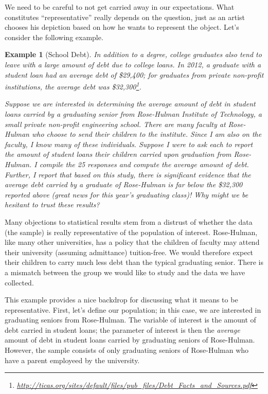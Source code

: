 \documentclass[
]{book}
\theoremstyle{plain}
\theoremstyle{mydefn}
\theoremstyle{myexmpl}
\newtheorem{example}{Example}[chapter]
\theoremstyle{remark}
\begin{document}
We need to be careful to not get carried away in our expectations. What constitutes ``representative'' really depends on the question, just as an artist chooses his depiction based on how he wants to represent the object. Let's consider the following example.

\begin{example}[School Debt]
\protect\hypertarget{exm:data-school-debt}{}{\label{exm:data-school-debt} {} }In addition to a degree, college graduates also tend to leave with a large amount of debt due to college loans. In 2012, a graduate with a student loan had an average debt of \$29,400; for graduates from private non-profit institutions, the average debt was \$32,300\footnote{\url{http://ticas.org/sites/default/files/pub_files/Debt_Facts_and_Sources.pdf}}.

Suppose we are interested in determining the average amount of debt in student loans carried by a graduating senior from Rose-Hulman Institute of Technology, a small private non-profit engineering school. There are many faculty at Rose-Hulman who choose to send their children to the institute. Since I am also on the faculty, I know many of these individuals. Suppose I were to ask each to report the amount of student loans their children carried upon graduation from Rose-Hulman. I compile the 25 responses and compute the average amount of debt. Further, I report that based on this study, there is significant evidence that the average debt carried by a graduate of Rose-Hulman is far below the \$32,300 reported above (great news for this year's graduating class)! Why might we be hesitant to trust these results?
\end{example}

Many objections to statistical results stem from a distrust of whether the data (the sample) is really representative of the population of interest. Rose-Hulman, like many other universities, has a policy that the children of faculty may attend their university (assuming admittance) tuition-free. We would therefore expect their children to carry much less debt than the typical graduating senior. There is a mismatch between the group we would like to study and the data we have collected.

This example provides a nice backdrop for discussing what it means to be representative. First, let's define our population; in this case, we are interested in graduating seniors from Rose-Hulman. The variable of interest is the amount of debt carried in student loans; the parameter of interest is then the \emph{average} amount of debt in student loans carried by graduating seniors of Rose-Hulman. However, the sample consists of only graduating seniors of Rose-Hulman who have a parent employeed by the university.
\end{document}
